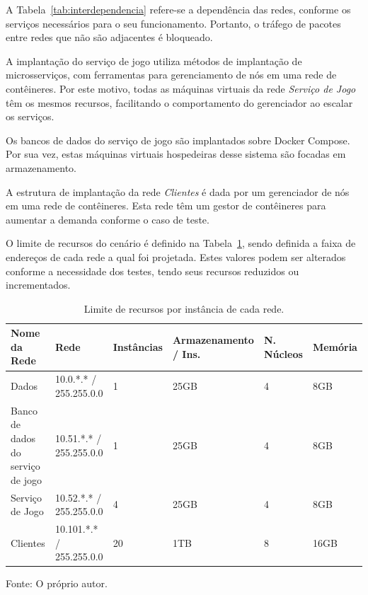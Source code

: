 A Tabela~\ref{tab:interdependencia} refere-se a dependência das redes, conforme os serviços necessários para o seu funcionamento.
%
Portanto, o tráfego de pacotes entre redes que não são adjacentes é bloqueado.

A implantação do serviço de jogo utiliza métodos de implantação de microsserviços, com ferramentas para gerenciamento de nós em uma rede de contêineres.
%
Por este motivo, todas as máquinas virtuais da rede \textit{Serviço de Jogo} têm os mesmos recursos, facilitando o comportamento do gerenciador ao escalar os serviços.

Os bancos de dados do serviço de jogo são implantados sobre Docker Compose.
%
Por sua vez, estas máquinas virtuais hospedeiras desse sistema são focadas em armazenamento.

A estrutura de implantação da rede \textit{Clientes} é dada por um gerenciador de nós em uma rede de contêineres.
%
Esta rede têm um gestor de contêineres para aumentar a demanda conforme o caso de teste.

O limite de recursos do cenário é definido na Tabela~\ref{tab:limite_recursos}, sendo definida a faixa de endereços de cada rede a qual foi projetada.
%
Estes valores podem ser alterados conforme a necessidade dos testes, tendo seus recursos reduzidos ou incrementados.

\begin{table}[htb!]
\centering
\begin{adjustbox}{max width=\textwidth}
\caption{Limite de recursos por instância de cada rede.}
\label{tab:limite_recursos}
\begin{tabular}{l|l|l|l|l|l}
\hline \hline
Nome da Rede                      & Rede                     & Instâncias & Armazenamento / Ins. & N. Núcleos & Memória \\ \hline \hline
Dados                             & 10.0.*.* / 255.255.0.0   & 1          & 25GB                & 4          & 8GB     \\ \hline
Banco de dados do serviço de jogo & 10.51.*.* / 255.255.0.0  & 1          & 25GB                & 4          & 8GB     \\ \hline
Serviço de Jogo                   & 10.52.*.* / 255.255.0.0  & 4         & 25GB                 & 4          & 8GB     \\ \hline
Clientes                          & 10.101.*.* / 255.255.0.0 & 20          & 1TB                 & 8          & 16GB     \\ \hline \hline
\end{tabular}
\end{adjustbox}

Fonte: O próprio autor.
\end{table}

